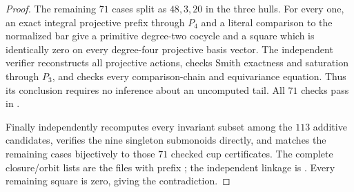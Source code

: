 \begin{proof}
The remaining $71$ cases split as $48,3,20$ in the three hulls.
For every one, an exact integral projective prefix through $P_4$
and a literal comparison to the normalized bar give a primitive
degree-two cocycle and a square which is identically zero on
every degree-four projective basis vector.  The independent
verifier  reconstructs
all projective actions, checks Smith exactness and saturation
through $P_3$, and checks every comparison-chain and equivariance
equation.  Thus its conclusion requires no inference about an
uncomputed tail.  All $71$ checks pass in
.

Finally  independently
recomputes every invariant subset among the $113$ additive
candidates, verifies the nine singleton submonoids directly,
and matches the remaining cases bijectively to those $71$
checked cup certificates.  The complete closure/orbit lists are
the files with prefix ; the
independent linkage is
.
Every remaining square is zero, giving the contradiction.
\end{proof}
